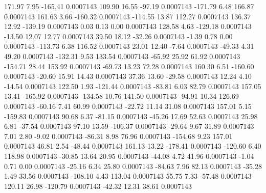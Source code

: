       171.97        7.95     -165.41     0.0007143
      109.90       16.55      -97.19     0.0007143
     -171.79        6.48      166.87     0.0007143
      161.63        3.66     -160.32     0.0007143
     -114.55       13.87      112.27     0.0007143
      136.37       12.92     -139.19     0.0007143
        0.03        0.13        0.00     0.0007143
      128.58        4.63     -129.18     0.0007143
      -13.50       12.07       12.77     0.0007143
       39.50       18.12      -32.26     0.0007143
       -1.39        0.78        0.00     0.0007143
     -113.73        6.38      116.52     0.0007143
       23.01       12.40       -7.64     0.0007143
      -49.33        4.31       49.20     0.0007143
     -132.31        9.53      133.54     0.0007143
      -65.92       25.92       61.92     0.0007143
     -154.71       28.44      153.92     0.0007143
      -69.73       13.23       72.28     0.0007143
      160.30        6.51     -160.60     0.0007143
      -20.60       15.91       14.43     0.0007143
       37.36       13.60      -29.58     0.0007143
       12.24        4.10      -14.54     0.0007143
      122.50        1.93     -121.44     0.0007143
      -83.81        6.03       82.79     0.0007143
      157.05       13.41     -165.92     0.0007143
     -134.58       10.76      141.50     0.0007143
      -94.91       10.34      126.69     0.0007143
      -60.16        7.41       60.99     0.0007143
      -22.72       11.14       31.08     0.0007143
      157.01        5.15     -159.83     0.0007143
       90.68        6.37      -81.15     0.0007143
      -45.26       17.69       52.63     0.0007143
       25.98        6.81      -37.54     0.0007143
       97.10       13.59     -106.37     0.0007143
      -29.64        9.67       31.89     0.0007143
        7.01        2.80       -9.02     0.0007143
      -86.31        8.98       76.96     0.0007143
     -154.68        9.23      157.01     0.0007143
       46.81        2.54      -48.44     0.0007143
      161.13       13.22     -178.41     0.0007143
     -120.60        6.40      118.98     0.0007143
      -30.85       13.64       20.95     0.0007143
      -44.08        4.72       41.96     0.0007143
       -1.04        0.71        0.00     0.0007143
      -25.16        6.34       25.80     0.0007143
      -84.63        7.96       82.13     0.0007143
      -35.28        1.49       33.56     0.0007143
     -108.10        4.43      113.04     0.0007143
       55.75        7.33      -57.48     0.0007143
      120.11       26.98     -120.79     0.0007143
      -42.32       12.31       38.61     0.0007143
